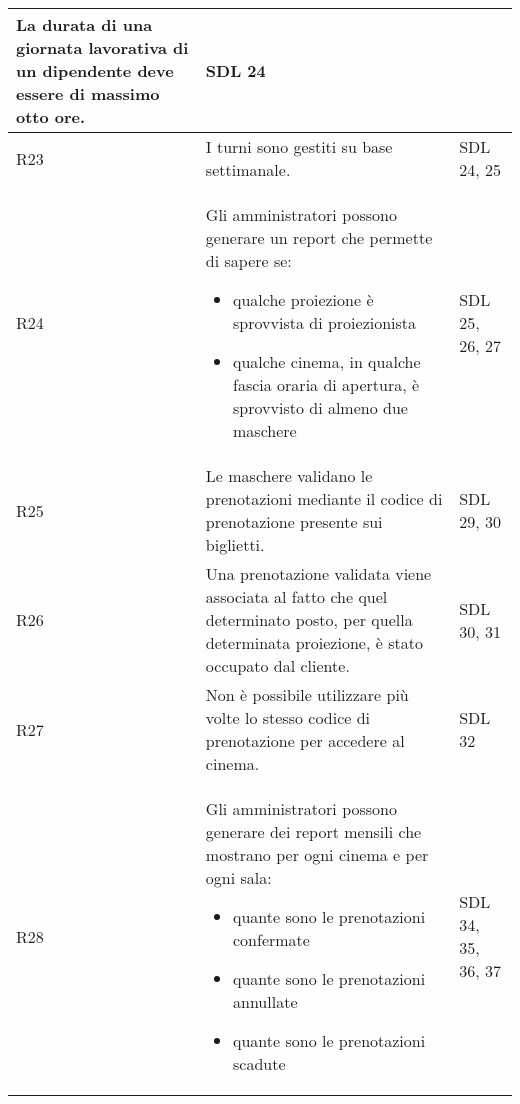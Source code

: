 \begin{longtable}{|p{0.8cm}|p{13.4cm}|p{2.1cm}|}
      La durata di una giornata lavorativa di un dipendente deve essere di
      massimo otto ore.                                                       &
      SDL 24
      \\\hline
      R23                                                                     &
      I turni sono gestiti su base settimanale.                               &
      SDL 24, 25
      \\\hline
      R24                                                                     &
      Gli amministratori possono generare un report che permette di sapere se:
      \begin{itemize}
            \item qualche proiezione è sprovvista di proiezionista
            \item qualche cinema, in qualche fascia oraria di apertura,
                  è sprovvisto di almeno due maschere
      \end{itemize}             &
      SDL 25, 26, 27
      \\\hline
      R25                                                                     &
      Le maschere validano le prenotazioni mediante il codice di prenotazione
      presente sui biglietti.                                                 &
      SDL 29, 30
      \\\hline
      R26                                                                     &
      Una prenotazione validata viene associata al fatto che quel determinato
      posto, per quella determinata proiezione, è stato occupato dal cliente. &
      SDL 30, 31
      \\\hline
      R27                                                                     &
      Non è possibile utilizzare più volte lo stesso codice di prenotazione
      per accedere al cinema.                                                 &
      SDL 32
      \\\hline
      R28                                                                     &
      Gli amministratori possono generare dei report mensili che mostrano
      per ogni cinema e per ogni sala:
      \begin{itemize}
            \item quante sono le prenotazioni confermate
            \item quante sono le prenotazioni annullate
            \item quante sono le prenotazioni scadute
      \end{itemize}                            &
      SDL 34, 35, 36, 37
      \\\hline
\end{longtable}

